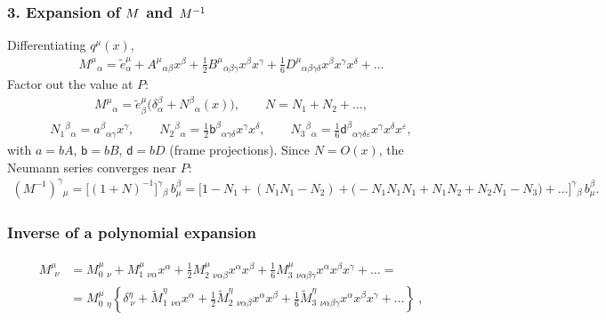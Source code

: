 \documentclass[letterpaper,10pt,english]{jupyterBook}
\begin{document}
\subsubsection{3. Expansion of \protect\(M\protect\) and \protect\(M^{-1}\protect\)}
\label{\detokenize{ch/relativity-general/geodesics-linearization:expansion-of-m-and-m-1}}
\sphinxAtStartPar
Differentiating \(q^\mu(x)\),
\begin{equation*}
\begin{split}
M^\mu{}_\alpha=\tilde e^\mu_\alpha+A^\mu{}_{\alpha\beta}x^\beta+\tfrac12B^\mu{}_{\alpha\beta\gamma}x^\beta x^\gamma+\tfrac16D^\mu{}_{\alpha\beta\gamma\delta}x^\beta x^\gamma x^\delta+\dots
\end{split}
\end{equation*}
\sphinxAtStartPar
Factor out the value at \(P\):
\begin{equation*}
\begin{split}
M^\mu{}_\alpha=\tilde e^\mu_\beta\big(\delta^\beta_\alpha+N^\beta{}_\alpha(x)\big),\qquad
N=N_1+N_2+\dots,
\end{split}
\end{equation*}\begin{equation*}
\begin{split}
N_1{}^\beta{}_\alpha=a^\beta{}_{\alpha\gamma}x^\gamma,\qquad
N_2{}^\beta{}_\alpha=\tfrac12\mathsf b^\beta{}_{\alpha\gamma\delta}x^\gamma x^\delta,\qquad
N_3{}^\beta{}_\alpha=\tfrac16\mathsf d^\beta{}_{\alpha\gamma\delta\varepsilon}x^\gamma x^\delta x^\varepsilon,
\end{split}
\end{equation*}
\sphinxAtStartPar
with \(a=bA\), \(\mathsf b=bB\), \(\mathsf d=bD\) (frame projections). Since \(N=O(x)\), the Neumann series converges near \(P\):
\begin{equation*}
\begin{split}
(M^{-1})^\gamma{}_\mu=\big[(1+N)^{-1}\big]^\gamma{}_\beta\,b^\beta_\mu=\Big[1-N_1+(N_1N_1-N_2)+\big(-N_1N_1N_1+N_1N_2+N_2N_1-N_3\big)+\dots\Big]^\gamma{}_\beta\,b^\beta_\mu .
\end{split}
\end{equation*}\subsubsection*{Inverse of a polynomial expansion}
\begin{equation*}
\begin{split}\begin{aligned}
M^{\mu}_{\ \ \nu} 
& = M^{\mu}_{0 \ \ \nu} + M^{\mu}_{1\ \ \nu \alpha} x^\alpha + \frac{1}{2} M^{\mu}_{2\ \ \nu \alpha \beta} x^\alpha x^\beta + \frac{1}{6} M^{\mu}_{3\ \ \nu \alpha \beta \gamma} x^\alpha x^\beta x^\gamma + \dots = \\
& = M^{\mu}_{0 \ \ \eta} \left\{ \delta^{\eta}_{\ \nu} + \widetilde{M}^{\eta}_{1\ \ \nu \alpha} x^\alpha + \frac{1}{2} \widetilde{M}^{\eta}_{2\ \ \nu \alpha \beta} x^\alpha x^\beta + \frac{1}{6} \widetilde{M}^{\eta}_{3\ \ \nu \alpha \beta \gamma} x^\alpha x^\beta x^\gamma + \dots \right\} \ ,
\end{aligned}\end{split}
\end{equation*}
\end{document}
